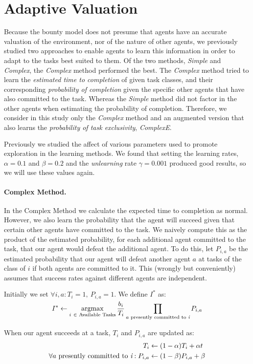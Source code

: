 \documentclass[letterpaper]{aamas2015}
\newcommand\paragrapha[1]{\paragraph*{{#1}.}}
\newcommand\bump{\vspace{10in}}
\DeclareMathOperator*{\argmax}{argmax}
\begin{document}
\section{Adaptive Valuation}

Because the bounty model does not presume that agents have an accurate valuation of the environment, nor of the nature of other agents, we previously studied two approaches to enable agents to learn this information in order to adapt to the tasks best suited to them.  Of the two methods, {\it Simple} and {\it Complex}, the {\it Complex} method performed the best.  The {\it Complex} method tried to learn the {\it estimated time to completion} of given task classes, and their corresponding {\it probability of completion} given the specific other agents that have also committed to the task.  Whereas the {\it Simple} method did not factor in the other agents when estimating the probability of completion.  Therefore, we consider in this study only the {\it Complex} method and an augmented version that also learns the {\it probability of task exclusivity}, {\it ComplexE}.

Previously we studied the affect of various parameters used to promote exploration in the learning methods.  We found that setting the learning rates, \(\alpha = 0.1\) and \(\beta=0.2\) and the {\it unlearning} rate \(\gamma=0.001\) produced good results, so we will use these values again.

\paragrapha{Complex Method}

In the Complex Method we calculate the expected time to completion as normal.  However, we also learn the probability that the agent will succeed given that certain other agents have committed to the task.  We naively compute this as the product of the estimated probability, for each additional agent committed to the task, that our agent would defeat the additional agent.  To do this, let \(P_{i,a}\) be the estimated probability that our agent will defeat another agent \(a\) at tasks of the class of \(i\) if both agents are committed to it.  This (wrongly but conveniently) assumes that success rates against different agents are independent.

Initially we set \(\forall {i, a}: T_i = 1,\ P_{i,a} = 1\).    We define \(I^*\) as:
\[
I^* \leftarrow \argmax_{i\ \in \text{\ Available Tasks}} \smash{\frac{b_i}{T_i}}  \prod_{a \text{\ presently committed to {\it i}}} P_{i,a}
\]


When our agent succeeds at a task, \(T_i\) and \(P_{i,a}\) are updated as:
\[
\begin{split}
T_i &\leftarrow (1-\alpha)T_i + \alpha t\\
\forall a\ {\text{presently committed to {\it i}}}: P_{i,a} &\leftarrow (1-\beta)P_{i,a} + \beta\\
\end{split}
\]
\end{document}
